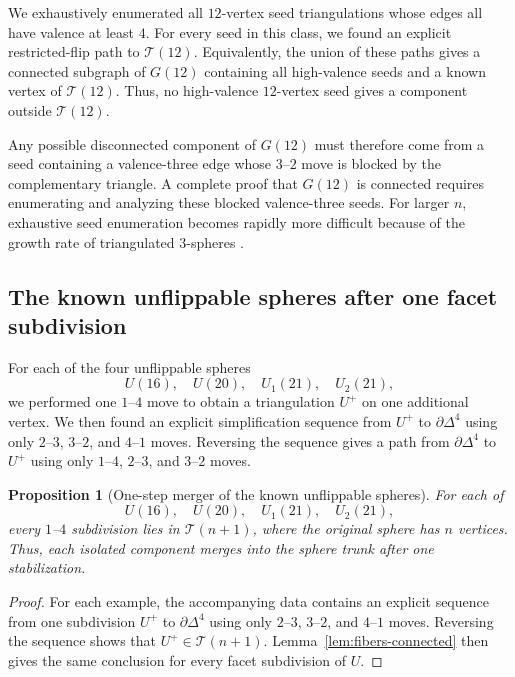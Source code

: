 \documentclass[11pt]{article}
\newtheorem{proposition}[theorem]{Proposition}
\theoremstyle{remark}
\theoremstyle{plain}
\begin{document}
We exhaustively enumerated all \(12\)-vertex seed triangulations whose edges
all have valence at least \(4\).  For every seed in this class, we found an
explicit restricted-flip path to \(\mathcal T(12)\).  Equivalently, the union
of these paths gives a connected subgraph of \(G(12)\) containing
all high-valence seeds and a known vertex of \(\mathcal T(12)\).  Thus, no
high-valence \(12\)-vertex seed gives a component outside
\(\mathcal T(12)\).

Any possible disconnected component of \(G(12)\) must therefore
come from a seed containing a valence-three edge whose \(3\)--\(2\) move is
blocked by the complementary triangle.  A complete proof that
\(G(12)\) is connected requires enumerating and analyzing these
blocked valence-three seeds.  For larger \(n\), exhaustive seed enumeration
becomes rapidly more difficult because of the growth rate of triangulated
\(3\)-spheres \cite{NSW16}.

\subsection{The known unflippable spheres after one facet subdivision}

For each of the four unflippable spheres
\[
 U(16),\quad U(20),\quad U_1(21),\quad U_2(21),
\]
we performed one \(1\)--\(4\) move to obtain a triangulation \(U^+\) on one
additional vertex.  We then found an explicit simplification sequence from
\(U^+\) to \(\partial\Delta^4\) using only \(2\)--\(3\), \(3\)--\(2\),
and \(4\)--\(1\) moves.  Reversing the sequence gives a path from
\(\partial\Delta^4\) to \(U^+\) using only \(1\)--\(4\), \(2\)--\(3\),
and \(3\)--\(2\) moves.

\begin{proposition}[One-step merger of the known unflippable spheres]
\label{prop:one-step-absorption}
For each of
\[
 U(16),\quad U(20),\quad U_1(21),\quad U_2(21),
\]
every \(1\)--\(4\) subdivision lies in \(\mathcal T(n+1)\), where
the original sphere has \(n\) vertices.  Thus, each isolated component
merges into the sphere trunk after one stabilization.
\end{proposition}

\begin{proof}
For each example, the accompanying data contains an explicit sequence from
one subdivision \(U^+\) to \(\partial\Delta^4\) using only \(2\)--\(3\),
\(3\)--\(2\), and \(4\)--\(1\) moves.  Reversing the sequence shows that
\(U^+\in\mathcal T(n+1)\).  Lemma~\ref{lem:fibers-connected} then gives the
same conclusion for every facet subdivision of \(U\).
\end{proof}
\end{document}
